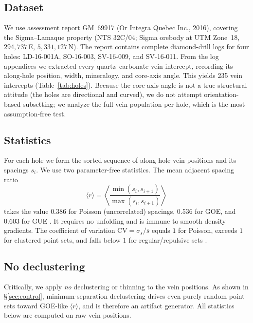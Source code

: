 \documentclass[11pt]{article}
\begin{document}
\subsection{Dataset}
We use assessment report GM~69917 (Or Integra Quebec Inc., 2016), covering the
Sigma--Lamaque property (NTS 32C/04; Sigma orebody at UTM Zone~18,
$294{,}737$\,E, $5{,}331{,}127$\,N). The report contains complete diamond-drill
logs for four holes: LD-16-001A, SO-16-003, SV-16-009, and SV-16-011. From the
log appendices we extracted every quartz--carbonate vein intercept, recording
its along-hole position, width, mineralogy, and core-axis angle. This yields
235 vein intercepts (Table~\ref{tab:holes}). Because the core-axis angle is not
a true structural attitude (the holes are directional and curved), we do not
attempt orientation-based subsetting; we analyze the full vein population per
hole, which is the most assumption-free test.

\subsection{Statistics}
For each hole we form the sorted sequence of along-hole vein positions and its
spacings $s_i$. We use two parameter-free statistics. The mean adjacent
spacing ratio
\begin{equation}
\langle r\rangle = \left\langle
\frac{\min(s_i,s_{i+1})}{\max(s_i,s_{i+1})}\right\rangle
\end{equation}
takes the value $0.386$ for Poisson (uncorrelated) spacings, $0.536$ for GOE,
and $0.603$ for GUE \citep{atas2013}. It requires no unfolding and is immune to
smooth density gradients. The coefficient of variation $\mathrm{CV}=\sigma_s/
\bar{s}$ equals $1$ for Poisson, exceeds $1$ for clustered point sets, and falls
below $1$ for regular/repulsive sets \citep{cox1966}.

\subsection{No declustering}
Critically, we apply \emph{no} declustering or thinning to the vein positions.
As shown in \S\ref{sec:control}, minimum-separation declustering drives even
purely random point sets toward GOE-like $\langle r\rangle$, and is therefore an
artifact generator. All statistics below are computed on raw vein positions.
\end{document}
